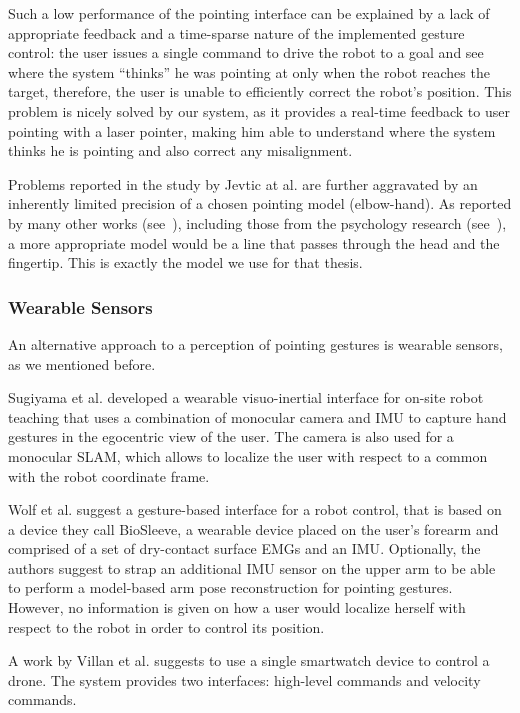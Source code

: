 Such a low performance of the pointing interface can be explained by a lack of appropriate feedback and a time-sparse nature of the implemented gesture control: the user issues a single command to drive the robot to a goal and see where the system ``thinks'' he was pointing at only when the robot reaches the target, therefore, the user is unable to efficiently correct the robot's position. This problem is nicely solved by our system, as it provides a real-time feedback to user pointing with a laser pointer, making him able to understand where the system thinks he is pointing and also correct any misalignment.

Problems reported in the study by Jevtic at al. \cite{Jevtic2015} are further aggravated by an inherently limited precision of a chosen pointing model (elbow-hand). As reported by many other works (see~\cite{Abidi2013,Nickel2007,Droeschel2011}), including those from the psychology research (see~\cite{Taylor1988,Herbort2016}), a more appropriate model would be a line that passes through the head and the fingertip. This is exactly the model we use for that thesis.

\subsubsection*{Wearable Sensors}
An alternative approach to a perception of pointing gestures is wearable sensors, as we mentioned before. 

Sugiyama et al. \cite{Sugiyama2013} developed a wearable visuo-inertial interface for on-site robot teaching that uses a combination of monocular camera and \ac{IMU} to capture hand gestures in the egocentric view of the user. The camera is also used for a monocular \ac{SLAM}, which allows to localize the user with respect to a common with the robot coordinate frame.

Wolf et al. \cite{Wolf2013} suggest a gesture-based interface for a robot control, that is based on a device they call BioSleeve, a wearable device placed on the user's forearm and comprised of a set of dry-contact surface \ac{EMGs} and an \ac{IMU}. Optionally, the authors suggest to strap an additional \ac{IMU} sensor on the upper arm to be able to perform a model-based arm pose reconstruction for pointing gestures. However, no information is given on how a user would localize herself with respect to the robot in order to control its position.

A work by Villan et al. \cite{Villani2017} suggests to use a single smartwatch device to control a drone. The system provides two interfaces: high-level commands and velocity commands.

